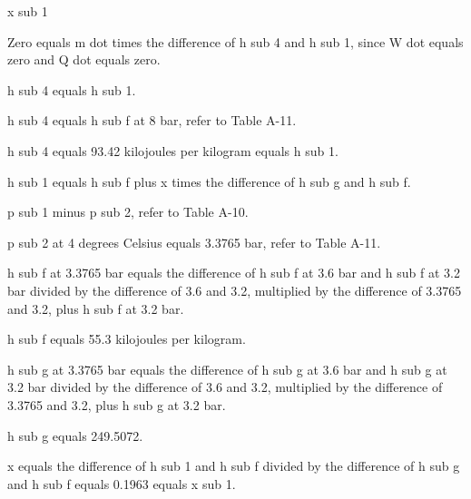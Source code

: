 x sub 1

Zero equals m dot times the difference of h sub 4 and h sub 1, since W dot equals zero and Q dot equals zero.

h sub 4 equals h sub 1.

h sub 4 equals h sub f at 8 bar, refer to Table A-11.

h sub 4 equals 93.42 kilojoules per kilogram equals h sub 1.

h sub 1 equals h sub f plus x times the difference of h sub g and h sub f.

p sub 1 minus p sub 2, refer to Table A-10.

p sub 2 at 4 degrees Celsius equals 3.3765 bar, refer to Table A-11.

h sub f at 3.3765 bar equals the difference of h sub f at 3.6 bar and h sub f at 3.2 bar divided by the difference of 3.6 and 3.2, multiplied by the difference of 3.3765 and 3.2, plus h sub f at 3.2 bar.

h sub f equals 55.3 kilojoules per kilogram.

h sub g at 3.3765 bar equals the difference of h sub g at 3.6 bar and h sub g at 3.2 bar divided by the difference of 3.6 and 3.2, multiplied by the difference of 3.3765 and 3.2, plus h sub g at 3.2 bar.

h sub g equals 249.5072.

x equals the difference of h sub 1 and h sub f divided by the difference of h sub g and h sub f equals 0.1963 equals x sub 1.